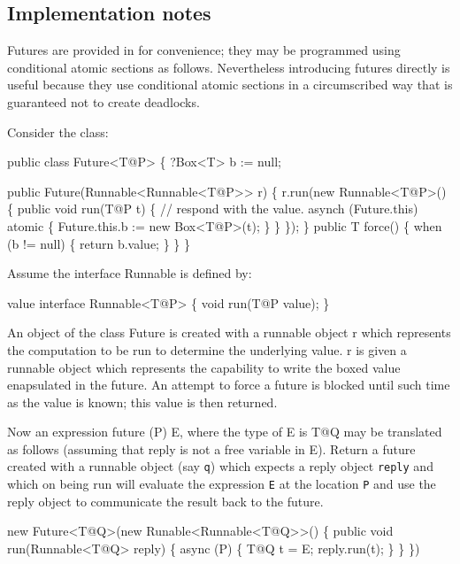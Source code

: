 \subsection{Implementation notes}
Futures are provided in \Xten{} for convenience; they may be
programmed using conditional atomic sections as follows. Nevertheless
introducing futures directly is useful because they use conditional
atomic sections in a circumscribed way that is guaranteed not to
create deadlocks.

Consider the class:
\begin{x10}
public class Future<T@P> \{
    ?Box<T> b := null;

    public Future(Runnable<Runnable<T@P>> r) \{
        r.run(new Runnable<T@P>() \{
            public void run(T@P t) \{
                // respond with the value.
                asynch (Future.this) atomic \{
                    Future.this.b := new Box<T@P>(t);
                \}
            \}
        \});
    \}
    public T force() \{
        when (b != null) \{
            return b.value;
        \}
    \}
\}
\end{x10}
\noindent Assume the interface {\cf Runnable} is defined by:
\begin{x10}
 value interface Runnable<T@P> \{
   void run(T@P value);
 \}
\end{x10}

\noindent An object of the class {\cf Future} is created with a 
runnable object {\cf r} which represents the computation to be run to
determine the underlying value. {\cf r} is given a runnable object
which represents the capability to write the boxed value enapsulated
in the future. An attempt to force a future is blocked until such time as the value is known; this value is then returned.

Now an expression {\cf future (P) E}, where the type of {\cf E} is
{\cf T@Q} may be translated as follows (assuming that {\cf reply} is
not a free variable in {\cf E}). Return a future created with a
runnable object (say {\tt q}) which expects a reply object {\tt reply}
and which on being run will evaluate the expression {\tt E} at the
location {\tt P} and use the {\cf reply} object to communicate the
result back to the future.

\begin{x10}
 new Future<T@Q>(new Runable<Runnable<T@Q>>() \{
     public void run(Runnable<T@Q> reply) \{
         async (P) \{ 
             T@Q t = E;
             reply.run(t);
         \}
     \}
 \})
\end{x10}

